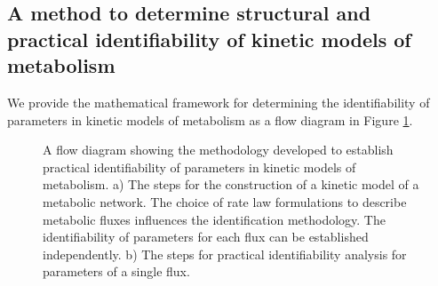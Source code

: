 \documentclass[10pt]{article}
\begin{document}
	\subsection{A method to determine structural and practical identifiability of kinetic models of metabolism}\label{sec:ident}
	We provide the mathematical framework for determining the identifiability of parameters in kinetic models of metabolism as a flow diagram in Figure \ref{fig:ident-flowchart}. 
	
	\begin{figure}[!tbhp]
		\caption{A flow diagram showing the methodology developed to establish practical identifiability of parameters in kinetic models of metabolism. a) The steps for the construction of a kinetic model of a metabolic network. The choice of rate law formulations to describe metabolic fluxes influences the identification methodology. The identifiability of parameters for each flux can be established independently. b) The steps for practical identifiability analysis for parameters of a single flux.}\label{fig:ident-flowchart}
	\end{figure}	
	
\end{document}
